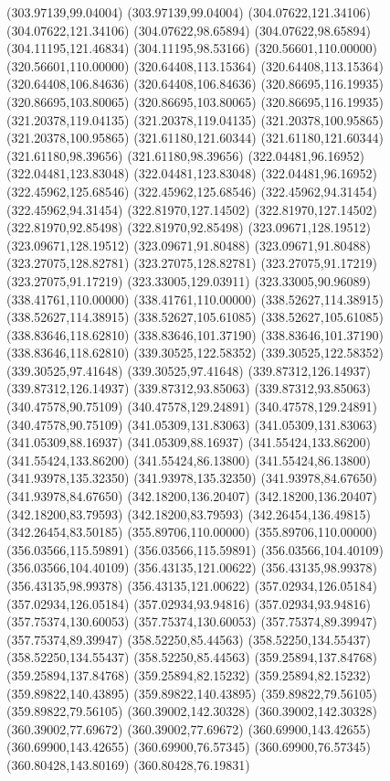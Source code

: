 {(303.97139,99.04004) (303.97139,99.04004) (304.07622,121.34106) (304.07622,121.34106) (304.07622,98.65894) (304.07622,98.65894) (304.11195,121.46834) (304.11195,98.53166)
(320.56601,110.00000) (320.56601,110.00000) (320.64408,113.15364) (320.64408,113.15364) (320.64408,106.84636) (320.64408,106.84636) (320.86695,116.19935) (320.86695,103.80065)
(320.86695,103.80065) (320.86695,116.19935) (321.20378,119.04135) (321.20378,119.04135) (321.20378,100.95865) (321.20378,100.95865) (321.61180,121.60344) (321.61180,121.60344)
(321.61180,98.39656) (321.61180,98.39656) (322.04481,96.16952) (322.04481,123.83048) (322.04481,123.83048) (322.04481,96.16952) (322.45962,125.68546) (322.45962,125.68546)
(322.45962,94.31454) (322.45962,94.31454) (322.81970,127.14502) (322.81970,127.14502) (322.81970,92.85498) (322.81970,92.85498) (323.09671,128.19512) (323.09671,128.19512)
(323.09671,91.80488) (323.09671,91.80488) (323.27075,128.82781) (323.27075,128.82781) (323.27075,91.17219) (323.27075,91.17219) (323.33005,129.03911) (323.33005,90.96089)
(338.41761,110.00000) (338.41761,110.00000) (338.52627,114.38915) (338.52627,114.38915) (338.52627,105.61085) (338.52627,105.61085) (338.83646,118.62810) (338.83646,101.37190)
(338.83646,101.37190) (338.83646,118.62810) (339.30525,122.58352) (339.30525,122.58352) (339.30525,97.41648) (339.30525,97.41648) (339.87312,126.14937) (339.87312,126.14937)
(339.87312,93.85063) (339.87312,93.85063) (340.47578,90.75109) (340.47578,129.24891) (340.47578,129.24891) (340.47578,90.75109) (341.05309,131.83063) (341.05309,131.83063)
(341.05309,88.16937) (341.05309,88.16937) (341.55424,133.86200) (341.55424,133.86200) (341.55424,86.13800) (341.55424,86.13800) (341.93978,135.32350) (341.93978,135.32350)
(341.93978,84.67650) (341.93978,84.67650) (342.18200,136.20407) (342.18200,136.20407) (342.18200,83.79593) (342.18200,83.79593) (342.26454,136.49815) (342.26454,83.50185)
(355.89706,110.00000) (355.89706,110.00000) (356.03566,115.59891) (356.03566,115.59891) (356.03566,104.40109) (356.03566,104.40109) (356.43135,121.00622) (356.43135,98.99378)
(356.43135,98.99378) (356.43135,121.00622) (357.02934,126.05184) (357.02934,126.05184) (357.02934,93.94816) (357.02934,93.94816) (357.75374,130.60053) (357.75374,130.60053)
(357.75374,89.39947) (357.75374,89.39947) (358.52250,85.44563) (358.52250,134.55437) (358.52250,134.55437) (358.52250,85.44563) (359.25894,137.84768) (359.25894,137.84768)
(359.25894,82.15232) (359.25894,82.15232) (359.89822,140.43895) (359.89822,140.43895) (359.89822,79.56105) (359.89822,79.56105) (360.39002,142.30328) (360.39002,142.30328)
(360.39002,77.69672) (360.39002,77.69672) (360.69900,143.42655) (360.69900,143.42655) (360.69900,76.57345) (360.69900,76.57345) (360.80428,143.80169) (360.80428,76.19831)
}
